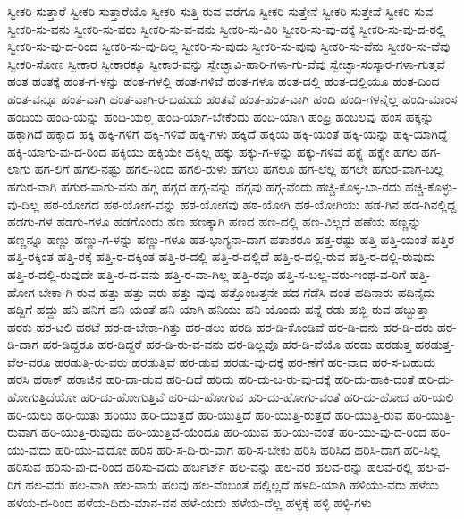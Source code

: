 {ಸ್ವೀಕರಿ-ಸುತ್ತಾರೆ
ಸ್ವೀಕರಿ-ಸುತ್ತಾರೆಯೊ
ಸ್ವೀಕರಿ-ಸುತ್ತಿ-ರುವ-ವರೆಗೂ
ಸ್ವೀಕರಿ-ಸುತ್ತೇನೆ
ಸ್ವೀಕರಿ-ಸುತ್ತೇವೆ
ಸ್ವೀಕರಿ-ಸುವ
ಸ್ವೀಕರಿ-ಸು-ವನು
ಸ್ವೀಕರಿ-ಸು-ವರು
ಸ್ವೀಕರಿ-ಸು-ವ-ವನು
ಸ್ವೀಕರಿ-ಸು-ವಿರಿ
ಸ್ವೀಕರಿ-ಸು-ವು-ದಕ್ಕೆ
ಸ್ವೀಕರಿ-ಸು-ವು-ದ-ರಲ್ಲಿ
ಸ್ವೀಕರಿ-ಸು-ವು-ದ-ರಿಂದ
ಸ್ವೀಕರಿ-ಸು-ವು-ದಿಲ್ಲ
ಸ್ವೀಕರಿ-ಸು-ವುದು
ಸ್ವೀಕರಿ-ಸು-ವುವು
ಸ್ವೀಕರಿ-ಸು-ವೆನು
ಸ್ವೀಕರಿ-ಸು-ವೆವು
ಸ್ವೀಕರಿ-ಸೋಣ
ಸ್ವೀಕಾರ
ಸ್ವೀಕಾರಕ್ಕೂ
ಸ್ವೀಕಾರ-ವನ್ನು
ಸ್ವೇಚ್ಛಾವಿ-ಹಾರಿ-ಗಳಾ-ಗು-ವೆವು
ಸ್ವೇಚ್ಛಾ-ಸಂಸ್ಕಾರ-ಗಳಾ-ಗುತ್ತವೆ
ಹಂತ
ಹಂತಕ್ಕೆ
ಹಂತ-ಗ-ಳನ್ನು
ಹಂತ-ಗಳಲ್ಲಿ
ಹಂತ-ಗಳಿವೆ
ಹಂತ-ಗಳೂ
ಹಂತ-ದಲ್ಲಿ
ಹಂತ-ದಲ್ಲಿಯೂ
ಹಂತ-ದಿಂದ
ಹಂತ-ವನ್ನೂ
ಹಂತ-ವಾಗಿ
ಹಂತ-ವಾಗಿ-ರ-ಬಹುದು
ಹಂತವೆ
ಹಂತ-ಹಂತ-ವಾಗಿ
ಹಂದಿ
ಹಂದಿ-ಗಳನ್ನೆಲ್ಲ
ಹಂದಿ-ಮಾಂಸ
ಹಂದಿಯ
ಹಂದಿ-ಯನ್ನು
ಹಂದಿ-ಯಲ್ಲ
ಹಂದಿ-ಯಾಗ-ಬೇಕೆಂದು
ಹಂದಿ-ಯಾಗಿ
ಹಂಫ್ರಿ
ಹಂಬಲವು
ಹಂಸ
ಹಕ್ಕನ್ನು
ಹಕ್ಕಾಗಿದೆ
ಹಕ್ಕಾದ
ಹಕ್ಕಿ
ಹಕ್ಕಿ-ಗಳಿಗೆ
ಹಕ್ಕಿ-ಗಳಿವೆ
ಹಕ್ಕಿ-ಗಳು
ಹಕ್ಕಿದೆ
ಹಕ್ಕಿಯ
ಹಕ್ಕಿ-ಯಂತೆ
ಹಕ್ಕಿ-ಯನ್ನು
ಹಕ್ಕಿ-ಯಾಗಿದ್ದೆ
ಹಕ್ಕಿ-ಯಾಗು-ವು-ದ-ರಿಂದ
ಹಕ್ಕಿಯು
ಹಕ್ಕಿಯೇ
ಹಕ್ಕಿಲ್ಲ
ಹಕ್ಕು
ಹಕ್ಕು-ಗ-ಳನ್ನು
ಹಕ್ಕು-ಗಳಿವೆ
ಹಕ್ಸ್ಲೆ
ಹಕ್ಸ್ಲೇ
ಹಗಲ
ಹಗ-ಲಾಗು
ಹಗ-ಲಿಗೆ
ಹಗಲಿ-ನಷ್ಟು
ಹಗಲಿ-ನಿಂದ
ಹಗಲಿ-ರುಳು
ಹಗಲು
ಹಗಲೂ
ಹಗ-ಲೆಲ್ಲ
ಹಗಲೇ
ಹಗುರ-ವಾಗ-ಬಲ್ಲ
ಹಗುರ-ವಾಗಿ
ಹಗುರ-ವಾಗು-ವನು
ಹಗ್ಗ
ಹಗ್ಗದ
ಹಗ್ಗ-ವನ್ನು
ಹಗ್ಗವು
ಹಗ್ಗ-ವೆಂದು
ಹಚ್ಚಿ-ಕೊಳ್ಳ-ಬಾ-ರದು
ಹಚ್ಚಿ-ಕೊಳ್ಳು-ವು-ದಿಲ್ಲ
ಹಠ-ಯೋಗದ
ಹಠ-ಯೋಗ-ವನ್ನು
ಹಠ-ಯೋಗವು
ಹಠ-ಯೋಗಿ
ಹಠ-ಯೋಗಿಯು
ಹಡ-ಗಿನ
ಹಡ-ಗಿನಲ್ಲಿದ್ದ
ಹಡಗು-ಗಳ
ಹಡಗು-ಗಳೂ
ಹಡಗೊಂದು
ಹಣ
ಹಣಕ್ಕಾಗಿ
ಹಣದ
ಹಣ-ದಲ್ಲಿ
ಹಣ-ವಿಲ್ಲದೆ
ಹಣೆಯ
ಹಣ್ಣನ್ನು
ಹಣ್ಣನ್ನೂ
ಹಣ್ಣು
ಹಣ್ಣು-ಗ-ಳನ್ನು
ಹಣ್ಣು-ಗಳೂ
ಹತ-ಭಾಗ್ಯನಾ-ದಾಗ
ಹತಾಶರೂ
ಹತ್ತ-ರಷ್ಟು
ಹತ್ತಿ
ಹತ್ತಿ-ಯಂತೆ
ಹತ್ತಿರ
ಹತ್ತಿ-ರಕ್ಕಿಂತ
ಹತ್ತಿ-ರಕ್ಕೆ
ಹತ್ತಿ-ರ-ದಕ್ಕಿಂತ
ಹತ್ತಿ-ರ-ದಲ್ಲಿ
ಹತ್ತಿ-ರ-ದಲ್ಲಿದೆ
ಹತ್ತಿ-ರ-ದಲ್ಲಿ-ರುವ
ಹತ್ತಿ-ರ-ದಲ್ಲಿ-ರುವುದು
ಹತ್ತಿ-ರ-ದಲ್ಲಿ-ರುವುದೇ
ಹತ್ತಿ-ರ-ದ-ವನು
ಹತ್ತಿ-ರ-ವಾ-ಗಿಲ್ಲ
ಹತ್ತಿ-ರವೂ
ಹತ್ತಿ-ಸ-ಬಲ್ಲ-ವರು-ಇಂಥ-ವ-ರಿಗೆ
ಹತ್ತಿ-ಹೋಗ-ಬೇಕಾ-ಗಿ-ರುವ
ಹತ್ತು
ಹತ್ತು-ವರು
ಹತ್ತು-ವುವು
ಹತ್ತೊಂಬತ್ತನೇ
ಹದ-ಗೆಡೆಸಿ-ದಂತೆ
ಹದಿನಾರು
ಹದಿನೈದು
ಹದ್ದಿಗೆ
ಹದ್ದು
ಹನಿ
ಹನಿಗೆ
ಹನಿ-ಯಂತೆ
ಹನಿ-ಯಾಗಿ
ಹನಿಯು
ಹನಿ-ಯೊಂದು
ಹನ್ನೆ-ರಡು
ಹಬ್ಬಿ-ರುವ
ಹಬ್ಬುತ್ತಾ
ಹರಕು
ಹರ-ಟಲಿ
ಹರಟೆ
ಹರ-ಡ-ಬೇಕಾ-ಗಿತ್ತು
ಹರ-ಡಲು
ಹರಡಿ
ಹರ-ಡಿ-ಕೊಂಡಿವೆ
ಹರ-ಡಿ-ದನು
ಹರ-ಡಿ-ದರು
ಹರ-ಡಿ-ದಾಗ
ಹರ-ಡಿದ್ದರೂ
ಹರ-ಡಿದ್ದರೆ
ಹರ-ಡಿ-ರು-ವ-ವನು
ಹರ-ಡಿಲ್ಲವೊ
ಹರ-ಡಿ-ವೆಯೊ
ಹರಡು
ಹರಡುತ್ತ
ಹರಡುತ್ತ-ವೆಆ-ವರೂ
ಹರಡುತ್ತಿ-ರು-ವರು
ಹರಡುತ್ತಿವೆ
ಹರ-ಡುವ
ಹರಡು-ವು-ದಕ್ಕೆ
ಹರ-ಣೆಗೆ
ಹರ-ವಾದ
ಹರ-ಸ-ಬಹುದು
ಹರಸಿ
ಹರಾಕ್
ಹರಾಜಿನ
ಹರಿ-ದಾ-ಡುವ
ಹರಿ-ದಿದೆ
ಹರಿದು
ಹರಿ-ದು-ಬ-ರು-ವು-ದಕ್ಕೆ
ಹರಿ-ದು-ಹಾಕಿ-ದಂತೆ
ಹರಿ-ದು-ಹೋಗುತ್ತಿದೆಯೋ
ಹರಿ-ದು-ಹೋಗುತ್ತಿವೆ
ಹರಿ-ದು-ಹೋಗುವ
ಹರಿ-ದು-ಹೋಗು-ವಂತೆ
ಹರಿ-ದು-ಹೋದ
ಹರಿ-ಯಲಿ
ಹರಿ-ಯಲು
ಹರಿ-ಯಿತು
ಹರಿಯು
ಹರಿ-ಯುತ್ತದೆ
ಹರಿ-ಯುತ್ತಿದೆ
ಹರಿ-ಯುತ್ತಿ-ರುತ್ತದೆ
ಹರಿ-ಯುತ್ತಿ-ರುವ
ಹರಿ-ಯುತ್ತಿ-ರುವಾಗ
ಹರಿ-ಯುತ್ತಿ-ರುವುದು
ಹರಿ-ಯುತ್ತಿವೆ-ಯೆಂದೂ
ಹರಿ-ಯುವ
ಹರಿ-ಯು-ವಂತೆ
ಹರಿ-ಯು-ವು-ದ-ರಿಂದ
ಹರಿ-ಯು-ವುದು
ಹರಿ-ಯು-ವುದೋ
ಹರಿಸ
ಹರಿ-ಸ-ದಿ-ರು-ವಾಗ
ಹರಿ-ಸ-ಬೇಕು
ಹರಿಸಿ
ಹರಿಸಿದ
ಹರಿಸಿ-ದಾಗ
ಹರಿ-ಸಿಲ್ಲ
ಹರಿಸುವ
ಹರಿಸು-ವು-ದ-ರಿಂದ
ಹರಿಸು-ವುದು
ಹರ್ಬರ್ಟ್
ಹಲ-ವನ್ನು
ಹಲ-ವರ
ಹಲವ-ರನ್ನು
ಹಲವ-ರಲ್ಲಿ
ಹಲ-ವ-ರಿಗೆ
ಹಲ-ವರು
ಹಲ-ವಾಗಿ
ಹಲ-ವಾರು
ಹಲವು
ಹಲ-ವೆಂಬಂತೆ
ಹಲ್ಲಿಲ್ಲದೆ
ಹಳದಿ-ಯಾಗಿ
ಹಳಿಯು-ವರು
ಹಳೆಯ
ಹಳೆಯ-ದ-ರಿಂದ
ಹಳೆಯ-ದಿದು-ಮಾನ-ವನ
ಹಳೆ-ಯದು
ಹಳೆಯ-ದೆಲ್ಲ
ಹಳ್ಳಕ್ಕೆ
ಹಳ್ಳಿ
ಹಳ್ಳಿ-ಗಳು
}
